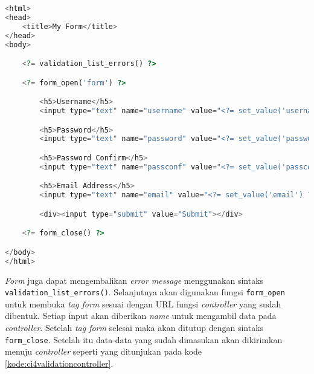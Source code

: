 \begin{lstlisting}[language=PHP, caption=Contoh kode untuk melakukan pengumpulan data. ,label=kode:ci4validationform]
<html>
<head>
    <title>My Form</title>
</head>
<body>

    <?= validation_list_errors() ?>

    <?= form_open('form') ?>

        <h5>Username</h5>
        <input type="text" name="username" value="<?= set_value('username') ?>" size="50">

        <h5>Password</h5>
        <input type="text" name="password" value="<?= set_value('password') ?>" size="50">

        <h5>Password Confirm</h5>
        <input type="text" name="passconf" value="<?= set_value('passconf') ?>" size="50">

        <h5>Email Address</h5>
        <input type="text" name="email" value="<?= set_value('email') ?>" size="50">

        <div><input type="submit" value="Submit"></div>

    <?= form_close() ?>

</body>
</html>
\end{lstlisting}

\textit{Form} juga dapat mengembalikan \textit{error message} menggunakan sintaks \texttt{validation\_list\_errors()}. Selanjutnya akan digunakan fungsi \texttt{form\_open} untuk membuka \textit{tag form} sesuai dengan URL fungsi \textit{controller} yang sudah dibentuk. Setiap input akan diberikan \textit{name} untuk mengambil data pada \textit{controller}. Setelah \textit{tag form} selesai maka akan ditutup dengan sintaks \texttt{form\_close}. Setelah itu data-data yang sudah dimasukan akan dikirimkan menuju \textit{controller} seperti yang ditunjukan pada kode \ref{kode:ci4validationcontroller}.

